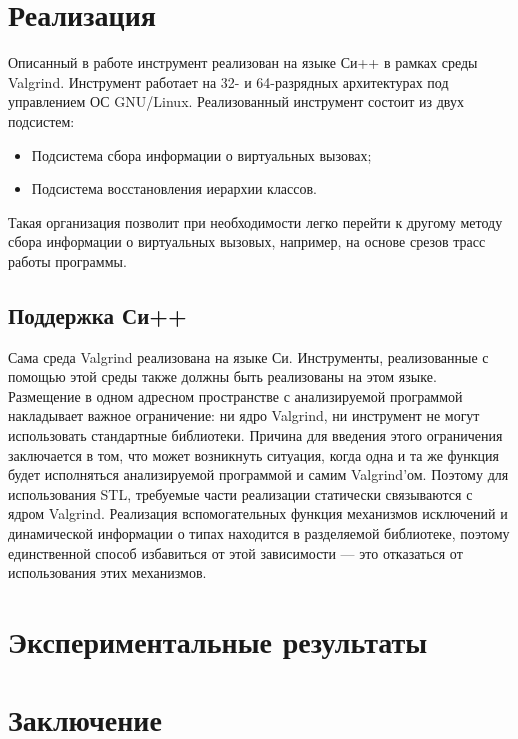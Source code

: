 \documentclass[a4paper,12pt,russian]{article}
\newcommand{\code}[1]{\textsf{#1}}
\begin{document}
\newpage
\section{Реализация}
Описанный в работе инструмент реализован на языке Си++ в рамках среды \code{Valgrind}. Инструмент работает на 32- и 64-разрядных архитектурах под управлением ОС \code{GNU/Linux}.
Реализованный инструмент состоит из двух подсистем:
\begin{itemize}
    \item Подсистема сбора информации о виртуальных вызовах;
    \item Подсистема восстановления иерархии классов.
\end{itemize}
Такая организация позволит при необходимости легко перейти к другому методу сбора информации о виртуальных вызовых, например, на основе срезов трасс работы программы.

\subsection{Поддержка Си++}
Сама среда \code{Valgrind} реализована на языке Си. Инструменты, реализованные с помощью этой среды также должны быть реализованы на этом языке.
Размещение в одном адресном пространстве с анализируемой программой накладывает важное ограничение: ни ядро \code{Valgrind}, ни инструмент не могут использовать стандартные библиотеки.
Причина для введения этого ограничения заключается в том, что может возникнуть ситуация, когда одна и та же функция будет исполняться анализируемой программой и самим \code{Valgrind}'ом.
Поэтому для использования \code{STL}, требуемые части реализации статически связываются с ядром \code{Valgrind}.
Реализация вспомогательных функция механизмов исключений и динамической информации о типах находится в разделяемой библиотеке, поэтому единственной способ избавиться от этой зависимости --- это отказаться от использования этих механизмов.

\newpage
\section{Экспериментальные результаты}
\newpage
\section{Заключение}


\clearpage
\end{document}
